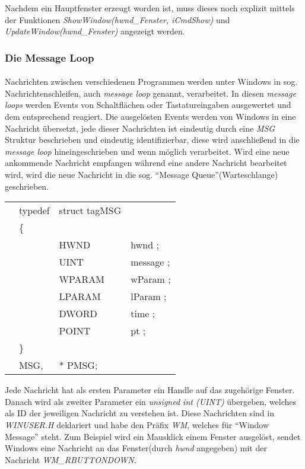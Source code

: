Nachdem ein Hauptfenster erzeugt worden ist, muss dieses noch explizit mittels der Funktionen \textit{ShowWindow(hwnd\_Fenster, iCmdShow)} und \textit{UpdateWindow(hwnd\_Fenster)}	angezeigt werden.

\subsubsection{Die Message Loop}\label{message-loop}
\paragraph{}
Nachrichten zwischen verschiedenen Programmen werden unter Windows in sog. Nachrichtenschleifen, auch \textit{message loop} genannt, verarbeitet. In diesen \textit{message loops}  werden Events von Schaltflächen oder Tastatureingaben ausgewertet und dem entsprechend reagiert. Die ausgelösten Events werden von Windows in eine Nachricht übersetzt, jede dieser Nachrichten ist eindeutig durch eine \textit{MSG} Struktur beschrieben und eindeutig identifizierbar, diese wird anschließend in die \textit{message loop} hineingeschrieben und wenn möglich verarbeitet. Wird eine neue ankommende Nachricht empfangen während eine andere Nachricht bearbeitet wird, wird die neue Nachricht in die sog. "`Message Queue"'(Warteschlange) geschrieben. 

\begin{tabular}{llll}
& typedef & struct tagMSG\\
& \{\\
&  & HWND   & hwnd ;\\
&  & UINT   & message ;\\
&  & WPARAM & wParam ;\\
&  & LPARAM & lParam ;\\
&  & DWORD  & time ;\\
&  & POINT  & pt ;\\
& \}\\
& MSG,&* PMSG;\\
\end{tabular}

Jede Nachricht hat als ersten Parameter ein Handle auf das zugehörige Fenster. Danach wird als zweiter Parameter ein \textit{unsigned int (UINT)} übergeben, welches als ID der jeweiligen Nachricht zu verstehen ist. Diese Nachrichten sind in \textit{WINUSER.H} deklariert und habe den Präfix \textit{WM}, welches für "`Window Message"' steht. Zum Beispiel wird ein Mausklick einem Fenster ausgelöst, sendet Windows eine Nachricht an das Fenster(durch \textit{hwnd} angegeben) mit der Nachricht \textit{WM\_RBUTTONDOWN}.\\

